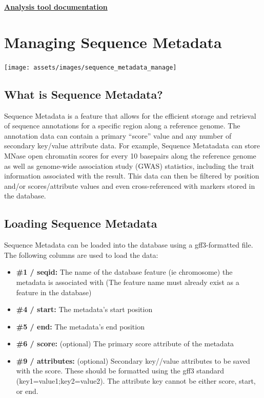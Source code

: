 \documentclass[
  12pt,
]{book}
\providecommand{\tightlist}{%
  \setlength{\itemsep}{0pt}\setlength{\parskip}{0pt}}
\begin{document}
\protect\hyperlink{spectral-analysis}{\textbf{Analysis tool documentation}}

\hypertarget{managing-sequence-metadata}{%
\chapter{Managing Sequence Metadata}\label{managing-sequence-metadata}}

\begin{center}\texttt{[image: assets/images/sequence\_metadata\_manage]} \end{center}

\hypertarget{what-is-sequence-metadata}{%
\section{What is Sequence Metadata?}\label{what-is-sequence-metadata}}

Sequence Metadata is a feature that allows for the efficient storage and retrieval of sequence annotations for a specific region along a reference genome. The annotation data can contain a primary ``score'' value and any number of secondary key/value attribute data. For example, Sequence Metatadata can store MNase open chromatin scores for every 10 basepairs along the reference genome as well as genome-wide association study (GWAS) statistics, including the trait information associated with the result. This data can then be filtered by position and/or scores/attribute values and even cross-referenced with markers stored in the database.

\hypertarget{loading-sequence-metadata}{%
\section{Loading Sequence Metadata}\label{loading-sequence-metadata}}

Sequence Metadata can be loaded into the database using a gff3-formatted file. The following columns are used to load the data:

\begin{itemize}
\tightlist
\item
  \textbf{\#1 / seqid:} The name of the database feature (ie chromosome) the metadata is associated with (The feature name must already exist as a feature in the database)
\item
  \textbf{\#4 / start:} The metadata's start position
\item
  \textbf{\#5 / end:} The metadata's end position
\item
  \textbf{\#6 / score:} (optional) The primary score attribute of the metadata
\item
  \textbf{\#9 / attributes:} (optional) Secondary key//value attributes to be saved with the score. These should be formatted using the gff3 standard (key1=value1;key2=value2). The attribute key cannot be either score, start, or end.
\end{itemize}
\end{document}
